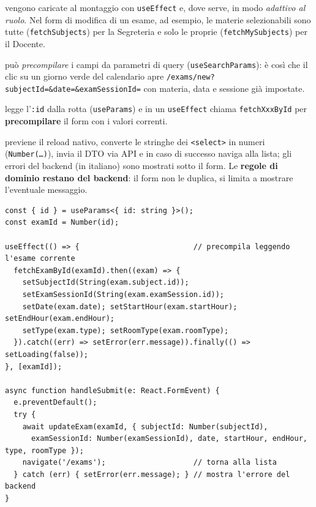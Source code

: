 \documentclass[11pt,a4paper,oneside]{report}
\newcommand{\code}[1]{\texttt{\small #1}}
\newcommand{\file}[1]{\texttt{\small #1}}
\begin{document}
\begin{description}[leftmargin=1.6em,style=nextline]
  \item[Le opzioni dei select] vengono caricate al montaggio con \code{useEffect}
        e, dove serve, in modo \emph{adattivo al ruolo}. Nel form di modifica di
        un esame, ad esempio, le materie selezionabili sono tutte
        (\code{fetchSubjects}) per la Segreteria e solo le proprie
        (\code{fetchMySubjects}) per il Docente.
  \item[La creazione] può \emph{precompilare} i campi da parametri di query
        (\code{useSearchParams}): è così che il clic su un giorno verde del
        calendario apre \code{/exams/new?subjectId=\&date=\&examSessionId=} con
        materia, data e sessione già impostate.
  \item[La modifica] legge l'\code{:id} dalla rotta (\code{useParams}) e in un
        \code{useEffect} chiama \code{fetchXxxById} per \textbf{precompilare} il
        form con i valori correnti.
  \item[Il submit] previene il reload nativo, converte le stringhe dei
        \code{<select>} in numeri (\code{Number(\ldots)}), invia il DTO via API e
        in caso di successo naviga alla lista; gli errori del backend (in
        italiano) sono mostrati sotto il form. Le \textbf{regole di dominio
        restano del backend}: il form non le duplica, si limita a mostrare
        l'eventuale messaggio.
\end{description}

\begin{lstlisting}[caption={Precompilazione e submit del form di modifica (estratto di \file{edit-exam.page.tsx}).}]
const { id } = useParams<{ id: string }>();
const examId = Number(id);

useEffect(() => {                          // precompila leggendo l'esame corrente
  fetchExamById(examId).then((exam) => {
    setSubjectId(String(exam.subject.id));
    setExamSessionId(String(exam.examSession.id));
    setDate(exam.date); setStartHour(exam.startHour); setEndHour(exam.endHour);
    setType(exam.type); setRoomType(exam.roomType);
  }).catch((err) => setError(err.message)).finally(() => setLoading(false));
}, [examId]);

async function handleSubmit(e: React.FormEvent) {
  e.preventDefault();
  try {
    await updateExam(examId, { subjectId: Number(subjectId),
      examSessionId: Number(examSessionId), date, startHour, endHour, type, roomType });
    navigate('/exams');                    // torna alla lista
  } catch (err) { setError(err.message); } // mostra l'errore del backend
}
\end{lstlisting}
\end{document}
